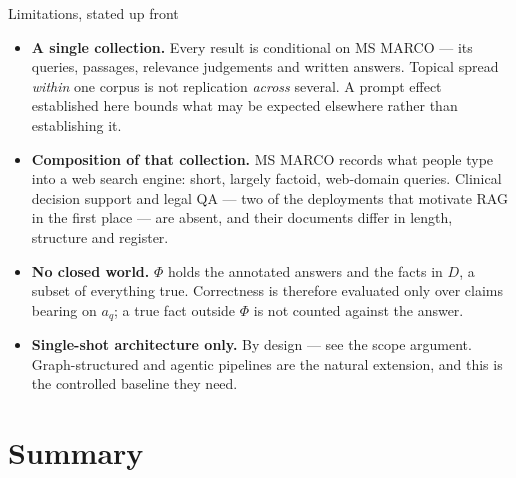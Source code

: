 \documentclass[11pt,aspectratio=169]{beamer}
\begin{document}
\begin{frame}{Limitations, stated up front}
  \begin{itemize}
    \item \textbf{A single collection.} Every result is conditional on MS
          MARCO --- its queries, passages, relevance judgements and written
          answers. Topical spread \emph{within} one corpus is not replication
          \emph{across} several. A prompt effect established here bounds what
          may be expected elsewhere rather than establishing it.
    \item \textbf{Composition of that collection.} MS MARCO records what
          people type into a web search engine: short, largely factoid,
          web-domain queries. Clinical decision support and legal QA --- two
          of the deployments that motivate RAG in the first place --- are
          absent, and their documents differ in length, structure and
          register.
    \item \textbf{No closed world.} $\Phi$ holds the annotated answers and the
          facts in $D$, a subset of everything true. Correctness is therefore
          evaluated only over claims bearing on $a_q$; a true fact outside
          $\Phi$ is not counted against the answer.
    \item \textbf{Single-shot architecture only.} By design --- see the scope
          argument. Graph-structured and agentic pipelines are the natural
          extension, and this is the controlled baseline they need.
  \end{itemize}
\end{frame}

\section{Summary}
\end{document}
